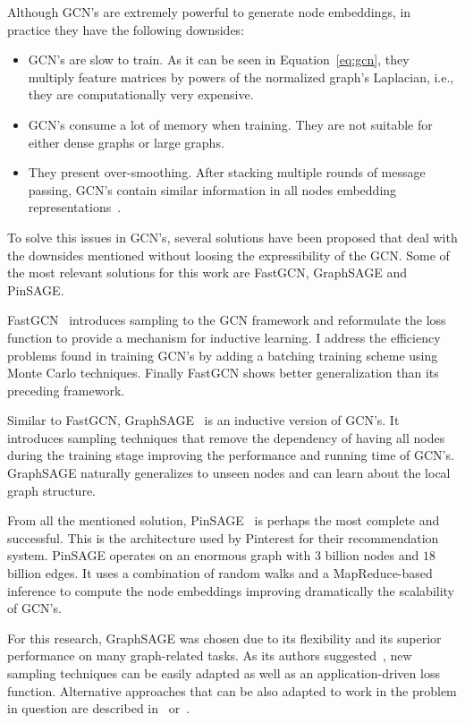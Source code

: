 Although GCN's are extremely powerful to generate node embeddings, in practice they have the following downsides:
\begin{itemize}
    \item GCN's are slow to train. As it can be seen in Equation~\ref{eq:gcn}, they multiply feature matrices by powers of the normalized graph's Laplacian, i.e., they are computationally very expensive. 
    \item GCN's consume a lot of memory when training. They are not suitable for either dense graphs or large graphs.
    \item They present over-smoothing. After stacking multiple rounds of message passing, GCN's contain similar information in all nodes embedding representations~\cite{hamilton}.
\end{itemize}

To solve this issues in GCN's, several solutions have been proposed that deal with the downsides mentioned without loosing the expressibility of the GCN. Some of the most relevant solutions for this work are FastGCN, GraphSAGE and PinSAGE.

FastGCN~\cite{fastgcn} introduces sampling to the GCN framework and reformulate the loss function to provide a mechanism for inductive learning. I address the efficiency problems found in training GCN's by adding a batching training scheme using Monte Carlo techniques. Finally FastGCN shows better generalization than its preceding framework. 

Similar to FastGCN, GraphSAGE~\cite{graphsage} is an inductive version of GCN's. It introduces sampling techniques that remove the dependency of having all nodes during the training stage improving the performance and running time of GCN's. GraphSAGE naturally generalizes to unseen nodes and can learn about the local graph structure.

From all the mentioned solution, PinSAGE~\cite{pinsage} is perhaps the most complete and successful. This is the architecture used by Pinterest for their recommendation system. PinSAGE operates on an enormous graph with $3$ billion nodes and $18$ billion edges. It uses a combination of random walks and a MapReduce-based inference to compute the node embeddings improving dramatically the scalability of GCN's.

For this research, GraphSAGE was chosen due to its flexibility and its superior performance on many graph-related tasks. As its authors suggested~\cite{graphsage}, new sampling techniques can be easily adapted as well as an application-driven loss function. Alternative approaches that can be also adapted to work in the problem in question are described in~\cite{gnnsurvey} or~\cite{hamilton}.

